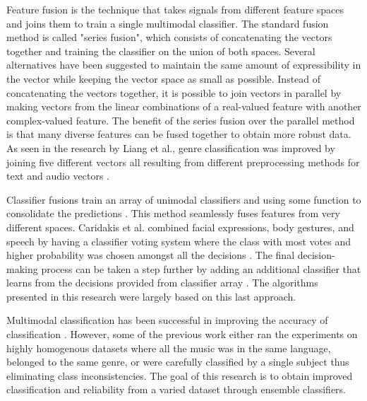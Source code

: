 Feature fusion is the technique that takes signals from different 
feature spaces and joins them to train a single multimodal classifier. The standard 
fusion method is called "series fusion", which consists of concatenating the vectors 
together and training the classifier on the union of both spaces. Several alternatives 
have been suggested to maintain the same amount of expressibility in the vector while 
keeping the vector space as small as possible. Instead of concatenating the vectors 
together, it is possible to join vectors in parallel \cite{yang2003feature} by making vectors from the linear
combinations of a real-valued feature with another complex-valued feature. The benefit 
of the series fusion over the parallel method is that many diverse features can be fused
together to obtain more robust data. As seen in the research by Liang et al., 
genre classification was improved by joining five different vectors all resulting from 
different preprocessing methods for text and audio vectors \cite{liang2011music}. 

Classifier fusions train an array of unimodal classifiers and using some 
function to consolidate the predictions \cite{ahmadian2013multi}. This method seamlessly fuses features 
from very different spaces. Caridakis et al. combined facial expressions, body gestures, 
and speech by having a classifier voting system where the class with most votes and 
higher probability was chosen amongst all the decisions \cite{caridakis2007multimodal}. The final decision-making 
process can be taken a step further by adding an additional classifier that learns from 
the decisions provided from classifier array \cite{li2008multi}.  The algorithms presented in this 
research were largely based on this last approach. 


Multimodal classification has been successful in improving the accuracy of classification 
 \cite{zhonga2012music} \cite{hu2010improving}.  However, some of the previous work either ran the experiments on highly homogenous 
datasets where all the music was in the same language, belonged to the same genre, or 
were carefully classified by a single subject thus eliminating class inconsistencies.  The goal of 
this research is to obtain improved classification and reliability from a varied dataset 
through ensemble classifiers. 


